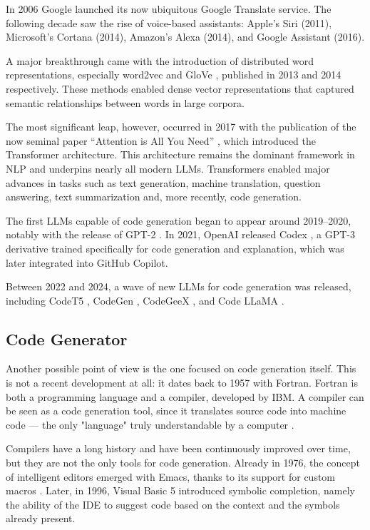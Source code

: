 In 2006 Google launched its now ubiquitous Google 
Translate service. The following decade saw the rise of voice-based 
assistants: Apple’s Siri (2011), Microsoft’s Cortana (2014), 
Amazon’s Alexa (2014), and Google Assistant (2016).

A major breakthrough came with the introduction of distributed word 
representations, especially word2vec \cite{mikolov2013efficient} and 
GloVe \cite{pennington2014glove}, published in 2013 and 2014 respectively. 
These methods enabled dense vector representations that captured semantic 
relationships between words in large corpora.

The most significant leap, however, occurred in 2017 with the publication 
of the now seminal paper “Attention is All You Need” 
\cite{vaswani2017attention}, which introduced the Transformer 
architecture. This architecture remains the dominant framework in 
NLP and underpins nearly all modern LLMs. Transformers enabled major 
advances in tasks such as text generation, machine translation, 
question answering, text summarization and, more recently, code 
generation.

The first LLMs capable of code generation began to appear around 
2019–2020, notably with the release of GPT-2 \cite{radford2019language}. 
In 2021, OpenAI released Codex \cite{chen2021codex}, a GPT-3 derivative 
trained specifically for code generation and explanation, which was
later integrated into GitHub Copilot.

Between 2022 and 2024, a wave of new LLMs for code generation was 
released, including CodeT5 \cite{wang2021codet5}, CodeGen 
\cite{nijkamp2022codegen}, CodeGeeX \cite{zeng2022codegeex}, 
and Code LLaMA \cite{roziere2023code}.


\subsection{Code Generator} %
\label{sec:Code_Generator}
Another possible point of view is the one focused on code 
generation itself. This is not a recent development at all: 
it dates back to 1957 with Fortran. Fortran is both a 
programming language and a compiler, developed by IBM. 
A compiler can be seen as a code generation tool, since it 
translates source code into machine code — the only "language" 
truly understandable by a computer \cite{backus1957fortran}.

Compilers have a long history and have been continuously 
improved over time, but they are not the only tools for code 
generation. Already in 1976, the concept of intelligent editors 
emerged with Emacs, thanks to its support for custom macros 
\cite{stallman1981emacs}. Later, in 1996, Visual Basic 5 
introduced symbolic completion, namely the ability of the IDE 
to suggest code based on the context and the symbols already present.

